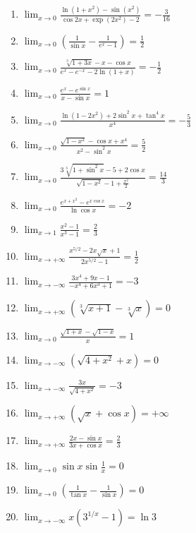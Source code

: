 \documentclass[11pt,a4paper]{article}
\begin{document}
\begin{enumerate}
\item $\displaystyle \lim_{x \to 0} \frac{\ln(1 + x^{2}) - \sin(x^{2})}{\cos 2x + \exp(2x^{2}) - 2} = -\frac{3}{16}$
\item $\displaystyle \lim_{x \to 0} \left(\frac{1}{\sin x} - \frac{1}{e^{x} - 1}\right) = \frac{1}{2}$
\item $\displaystyle \lim_{x \to 0} \frac{\sqrt[3]{1 + 3x} - x - \cos x}{e^{x} - e^{-x} - 2\ln(1 + x)} = -\frac{1}{2}$
\item $\displaystyle \lim_{x \to 0} \frac{e^{x} - e^{\sin x}}{x - \sin x} = 1$
\item $\displaystyle \lim_{x \to 0} \frac{\ln(1 - 2x^{2}) + 2\sin^{2} x + \tan^{4} x}{x^{4}} = -\frac{5}{3}$
\item $\displaystyle \lim_{x \to 0} \frac{\sqrt{1 - x^{2}} - \cos x + x^{4}}{x^{2} - \sin^{2} x} = \frac{5}{2}$
\item $\displaystyle \lim_{x \to 0} \frac{3\sqrt[3]{1 + \sin^{2} x} - 5 + 2\cos x}{\sqrt{1 - x^{2}} - 1 + \frac{x^{2}}{2}} = \frac{14}{3}$
\item $\displaystyle \lim_{x \to 0} \frac{e^{x + x^{2}} - e^{x\cos x}}{\ln\cos x} = -2$
\item $\displaystyle \lim_{x \to 1} \frac{x^{2} - 1}{x^{3} - 1} = \frac{2}{3}$
\item $\displaystyle \lim_{x \to +\infty} \frac{x^{5/2} - 2x\sqrt{x} + 1}{2x^{5/2} - 1} = \frac{1}{2}$
\item $\displaystyle \lim_{x \to -\infty} \frac{3x^{4} + 9x - 1}{-x^{4} + 6x^{3} + 1} = -3$
\item $\displaystyle \lim_{x \to +\infty} \left(\sqrt[3]{x + 1} - \sqrt[3]{x}\right) = 0$
\item $\displaystyle \lim_{x \to 0} \frac{\sqrt{1 + x} - \sqrt{1 - x}}{x} = 1$
\item $\displaystyle \lim_{x \to -\infty} \left(\sqrt{4 + x^{2}} + x\right) = 0$
\item $\displaystyle \lim_{x \to -\infty} \frac{3x}{\sqrt{4 + x^{2}}} = -3$
\item $\displaystyle \lim_{x \to +\infty} (\sqrt{x} + \cos x) = +\infty$
\item $\displaystyle \lim_{x \to +\infty} \frac{2x - \sin x}{3x + \cos x} = \frac{2}{3}$
\item $\displaystyle \lim_{x \to 0} \sin x \sin\frac{1}{x} = 0$
\item $\displaystyle \lim_{x \to 0} \left(\frac{1}{\tan x} - \frac{1}{\sin x}\right) = 0$
\item $\displaystyle \lim_{x \to -\infty} x\left(3^{1/x} - 1\right) = \ln 3$

\end{enumerate}
\end{document}
